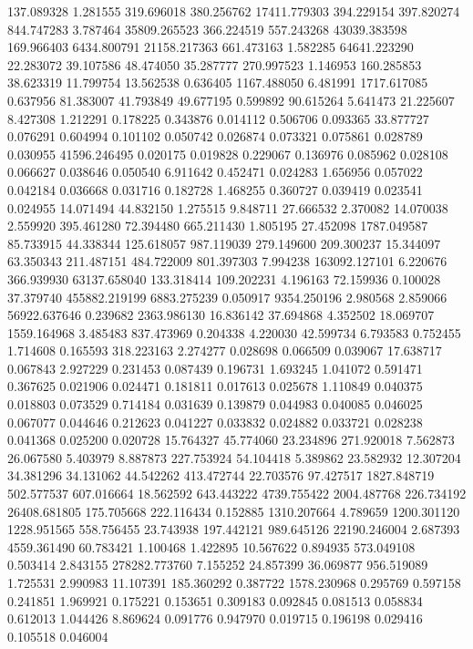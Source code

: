 137.089328
1.281555
319.696018
380.256762
17411.779303
394.229154
397.820274
844.747283
3.787464
35809.265523
366.224519
557.243268
43039.383598
169.966403
6434.800791
21158.217363
661.473163
1.582285
64641.223290
22.283072
39.107586
48.474050
35.287777
270.997523
1.146953
160.285853
38.623319
11.799754
13.562538
0.636405
1167.488050
6.481991
1717.617085
0.637956
81.383007
41.793849
49.677195
0.599892
90.615264
5.641473
21.225607
8.427308
1.212291
0.178225
0.343876
0.014112
0.506706
0.093365
33.877727
0.076291
0.604994
0.101102
0.050742
0.026874
0.073321
0.075861
0.028789
0.030955
41596.246495
0.020175
0.019828
0.229067
0.136976
0.085962
0.028108
0.066627
0.038646
0.050540
6.911642
0.452471
0.024283
1.656956
0.057022
0.042184
0.036668
0.031716
0.182728
1.468255
0.360727
0.039419
0.023541
0.024955
14.071494
44.832150
1.275515
9.848711
27.666532
2.370082
14.070038
2.559920
395.461280
72.394480
665.211430
1.805195
27.452098
1787.049587
85.733915
44.338344
125.618057
987.119039
279.149600
209.300237
15.344097
63.350343
211.487151
484.722009
801.397303
7.994238
163092.127101
6.220676
366.939930
63137.658040
133.318414
109.202231
4.196163
72.159936
0.100028
37.379740
455882.219199
6883.275239
0.050917
9354.250196
2.980568
2.859066
56922.637646
0.239682
2363.986130
16.836142
37.694868
4.352502
18.069707
1559.164968
3.485483
837.473969
0.204338
4.220030
42.599734
6.793583
0.752455
1.714608
0.165593
318.223163
2.274277
0.028698
0.066509
0.039067
17.638717
0.067843
2.927229
0.231453
0.087439
0.196731
1.693245
1.041072
0.591471
0.367625
0.021906
0.024471
0.181811
0.017613
0.025678
1.110849
0.040375
0.018803
0.073529
0.714184
0.031639
0.139879
0.044983
0.040085
0.046025
0.067077
0.044646
0.212623
0.041227
0.033832
0.024882
0.033721
0.028238
0.041368
0.025200
0.020728
15.764327
45.774060
23.234896
271.920018
7.562873
26.067580
5.403979
8.887873
227.753924
54.104418
5.389862
23.582932
12.307204
34.381296
34.131062
44.542262
413.472744
22.703576
97.427517
1827.848719
502.577537
607.016664
18.562592
643.443222
4739.755422
2004.487768
226.734192
26408.681805
175.705668
222.116434
0.152885
1310.207664
4.789659
1200.301120
1228.951565
558.756455
23.743938
197.442121
989.645126
22190.246004
2.687393
4559.361490
60.783421
1.100468
1.422895
10.567622
0.894935
573.049108
0.503414
2.843155
278282.773760
7.155252
24.857399
36.069877
956.519089
1.725531
2.990983
11.107391
185.360292
0.387722
1578.230968
0.295769
0.597158
0.241851
1.969921
0.175221
0.153651
0.309183
0.092845
0.081513
0.058834
0.612013
1.044426
8.869624
0.091776
0.947970
0.019715
0.196198
0.029416
0.105518
0.046004

